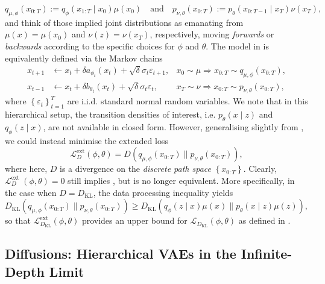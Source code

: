 \[
q_{\mu, \phi}\left(x_{0:T}\right):=q_{\phi}\left(x_{1:T} \mid x_0\right) \mu\left(x_0\right) \quad \text{and} \quad p_{\nu, \theta}\left(x_{0:T}\right):=p_{\theta}\left(x_{0:T-1} \mid x_T\right) \nu\left(x_T\right),
\]
and think of those implied joint distributions as emanating from $\mu(x)=\mu\left(x_0\right)$ and $\nu(z)=\nu\left(x_T\right)$, respectively, moving \textit{forwards} or \textit{backwards} according to the specific choices for $\phi$ and $\theta$. The model in  is equivalently defined via the Markov chains
\begin{subequations}
\begin{align}
x_{t+1} &\leftarrow x_t+\delta a_{\phi_t}\left(x_t\right)+ \sqrt{\delta}\sigma_t \varepsilon_{t+1}, & x_0 \sim \mu \Longrightarrow x_{0: T} \sim q_{\mu, \phi}\left(x_{0: T}\right), \label{eq:mc_framework_fwd_ch4} \\
x_{t-1} &\leftarrow x_t+ \delta b_{\theta_t}\left(x_t\right)+ \sqrt{\delta}\sigma_t \varepsilon_t, & x_T \sim \nu \Longrightarrow x_{0: T} \sim p_{\nu, \theta}\left(x_{0: T}\right), \label{eq:mc_framework_rev_ch4}
\end{align}
\end{subequations}
where $\left\{\varepsilon_t\right\}_{t=1}^T$ are i.i.d. standard normal random variables. We note that in this hierarchical setup, the transition densities of interest, i.e. $p_{\theta}(x \mid z)$ and $q_{\phi}(z \mid x)$, are not available in closed form. However, generalising slightly from , we could instead minimise the extended loss
\[
\mathcal{L}_D^{\operatorname{ext}}(\phi, \theta)=D\left(q_{\mu, \phi}\left(x_{0:T}\right) \| p_{\nu, \theta}\left(x_{0: T}\right)\right),
\]
where here, $D$ is a divergence on the \textit{discrete path space} $\left\{x_{0:T}\right\}$. Clearly, $\mathcal{L}_D^{\text {ext }}(\phi, \theta)=0$ still implies , but is no longer equivalent. More specifically, in the case when $D=D_{\mathrm{KL}}$, the data processing inequality \parencite{cover1999elements} yields
\[
    D_{\mathrm{KL}}\left(q_{\mu, \phi}\left(x_{0:T}\right) \| p_{\nu, \theta}\left(x_{0: T}\right)\right) \geq D_{\mathrm{KL}}\left(q_{\phi}(z \mid x) \mu(x) \| p_{\theta}(x \mid z) \mu(z)\right),
\]
so that $\mathcal{L}_{D_{\mathrm{KL}}}^{\text {ext}}(\phi, \theta)$ provides an upper bound for $\mathcal{L}_{D_{\mathrm{KL}}}(\phi, \theta)$ as defined in .

\subsection{Diffusions: Hierarchical VAEs in the Infinite-Depth Limit}

